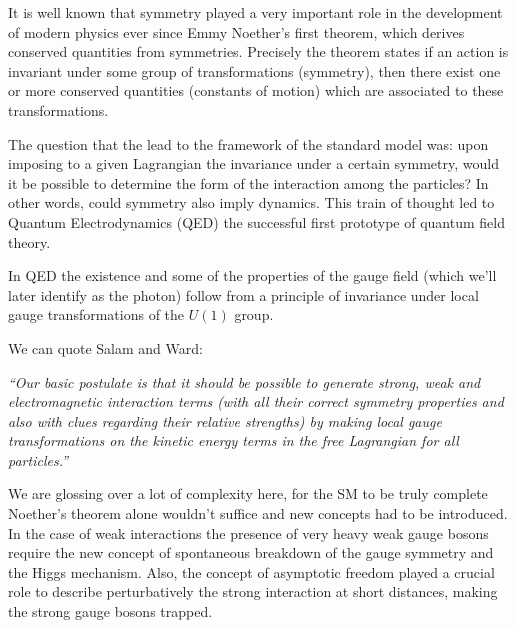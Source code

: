 It is well known that symmetry played a very important role in the development of modern physics ever since Emmy Noether's first theorem, which derives conserved quantities from symmetries. Precisely the theorem states if an action is invariant under some group of transformations (symmetry), then there exist one or more conserved quantities (constants of motion) which are associated to these transformations. 

The question that the lead to the framework of the standard model was:  upon imposing to a given Lagrangian the invariance under a certain symmetry, would it be possible to determine the form of the interaction among the particles? In other words, could symmetry also imply dynamics. This train of thought led to Quantum Electrodynamics (QED) the successful first prototype of quantum field theory.

In QED the existence and some of the properties of the gauge field (which we'll later identify as the photon) follow from a principle of invariance under local gauge transformations of the $U(1)$ group.

We can quote Salam and Ward: %

\textit{“Our basic postulate is that it should be possible to generate strong,  weak and electromagnetic  interaction terms (with all their correct symmetry properties and also with clues regarding their relative strengths) by making local gauge transformations on the kinetic energy terms in the free Lagrangian for all particles.”}

We are glossing over a lot of complexity here, for the SM to be truly  complete Noether's theorem alone wouldn't suffice and new concepts had to be introduced. In the case of weak interactions the presence of very heavy weak gauge bosons require the new concept of spontaneous breakdown  of  the  gauge  symmetry and  the Higgs  mechanism. 
%
Also, the  concept  of  asymptotic  freedom 
% 
played a crucial role to describe perturbatively the strong interaction at short distances, making the strong gauge bosons trapped. 

